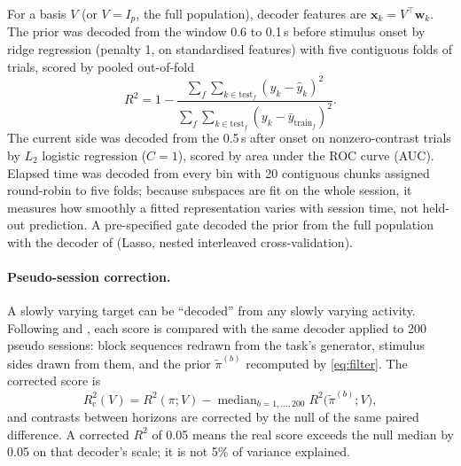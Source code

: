 \documentclass{article}
\newcommand{\bm}[1]{\boldsymbol{#1}}
\begin{document}
For a basis $V$ (or $V = I_p$, the full population), decoder features are $\bm x_k = V^\top \bm w_k$. The prior was
decoded from the window 0.6 to 0.1\,s before stimulus onset \citep{findling2025} by ridge regression (penalty 1, on
standardised features) with five contiguous folds of trials, scored by pooled out-of-fold
\begin{equation}
  R^2 = 1 - \frac{\sum_f \sum_{k \in \mathrm{test}_f} (y_k - \hat y_k)^2}{\sum_f \sum_{k \in \mathrm{test}_f} (y_k - \bar y_{\mathrm{train}_f})^2} .
\end{equation}
The current side was decoded from the 0.5\,s after onset on nonzero-contrast trials by $L_2$ logistic regression
($C = 1$), scored by area under the ROC curve (AUC). Elapsed time was decoded from every bin with 20 contiguous chunks
assigned round-robin to five folds; because subspaces are fit on the whole session, it measures how smoothly a fitted
representation varies with session time, not held-out prediction. A pre-specified gate decoded the prior from the
full population with the decoder of \citet{findling2025} (Lasso, nested interleaved cross-validation).

\paragraph{Pseudo-session correction.} A slowly varying target can be ``decoded'' from any slowly varying activity.
Following \citet{harris2020} and \citet{findling2025}, each score is compared with the same decoder applied to 200
pseudo sessions: block sequences redrawn from the task's generator, stimulus sides drawn from them, and the prior
$\tilde\pi^{(b)}$ recomputed by \eqref{eq:filter}. The corrected score is
\begin{equation}
  R^2_{\mathrm c}(V) = R^2(\pi; V) - \operatorname{median}_{b=1,\dots,200} R^2\big(\tilde\pi^{(b)}; V\big) ,
  \label{eq:corrected}
\end{equation}
and contrasts between horizons are corrected by the null of the same paired difference. A corrected $R^2$ of 0.05 means
the real score exceeds the null median by 0.05 on that decoder's scale; it is not 5\% of variance explained.
\end{document}
